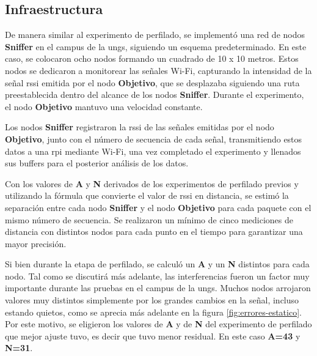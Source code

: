 \subsection{Infraestructura}

De manera similar al experimento de perfilado, se implementó una red de nodos \textbf{Sniffer} en el campus de la \acs{ungs}, siguiendo un esquema predeterminado. En este caso, se colocaron ocho nodos formando un cuadrado de 10 x 10 metros. Estos nodos se dedicaron a monitorear las señales Wi-Fi, capturando la intensidad de la señal \acs{rssi} emitida por el nodo \textbf{Objetivo}, que se desplazaba siguiendo una ruta preestablecida dentro del alcance de los nodos \textbf{Sniffer}. Durante el experimento, el nodo \textbf{Objetivo} mantuvo una velocidad constante.

Los nodos \textbf{Sniffer} registraron la \acs{rssi} de las señales emitidas por el nodo \textbf{Objetivo}, junto con el número de secuencia de cada señal, transmitiendo estos datos a una \acl{rpi} mediante Wi-Fi, una vez completado el experimento y llenados sus buffers para el posterior análisis de los datos.

Con los valores de \textbf{A} y \textbf{N} derivados de los experimentos de perfilado previos y utilizando la fórmula que convierte el valor de \acs{rssi} en distancia, se estimó la separación entre cada nodo \textbf{Sniffer} y el nodo \textbf{Objetivo} para cada paquete con el mismo número de secuencia. Se realizaron un mínimo de cinco mediciones de distancia con distintos nodos para cada punto en el tiempo para garantizar una mayor precisión.

Si bien durante la etapa de perfilado, se calculó un \textbf{A} y un \textbf{N} distintos para cada nodo. Tal como se discutirá más adelante, las interferencias fueron un factor muy importante durante las pruebas en el campus de la \acs{ungs}. Muchos nodos arrojaron valores muy distintos simplemente por los grandes cambios en la señal, incluso estando quietos, como se aprecia más adelante en la figura \ref{fig:errores-estatico}. Por este motivo, se eligieron los valores de \textbf{A} y de \textbf{N} del experimento de perfilado que mejor ajuste tuvo, es decir que tuvo menor residual.
En este caso \textbf{A=43} y \textbf{N=31}.


